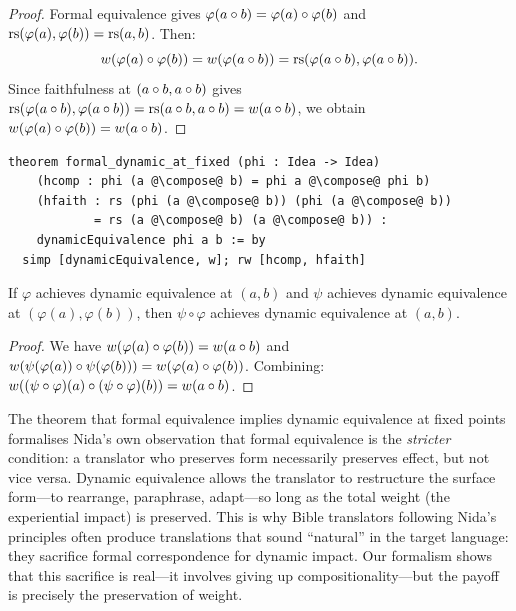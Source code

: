 \begin{proof}
Formal equivalence gives $\varphi(a \circ b) = \varphi(a) \circ
\varphi(b)$ and $\mathrm{rs}(\varphi(a), \varphi(b)) = \mathrm{rs}(a, b)$.  Then:
\[
  w(\varphi(a) \circ \varphi(b))
    = w(\varphi(a \circ b))
    = \mathrm{rs}(\varphi(a \circ b), \varphi(a \circ b)).
\]
Since faithfulness at $(a \circ b, a \circ b)$ gives
$\mathrm{rs}(\varphi(a \circ b), \varphi(a \circ b)) = \mathrm{rs}(a \circ b, a \circ b)
= w(a \circ b)$, we obtain $w(\varphi(a) \circ \varphi(b)) = w(a \circ b)$.
\end{proof}

\begin{lstlisting}
theorem formal_dynamic_at_fixed (phi : Idea -> Idea)
    (hcomp : phi (a @\compose@ b) = phi a @\compose@ phi b)
    (hfaith : rs (phi (a @\compose@ b)) (phi (a @\compose@ b))
            = rs (a @\compose@ b) (a @\compose@ b)) :
    dynamicEquivalence phi a b := by
  simp [dynamicEquivalence, w]; rw [hcomp, hfaith]
\end{lstlisting}

\begin{theorem}
\label{thm:dynamic-comp}
If $\varphi$ achieves dynamic equivalence at $(a, b)$ and $\psi$ achieves
dynamic equivalence at $(\varphi(a), \varphi(b))$, then $\psi \circ \varphi$
achieves dynamic equivalence at $(a, b)$.
\end{theorem}

\begin{proof}
We have $w(\varphi(a) \circ \varphi(b)) = w(a \circ b)$ and
$w(\psi(\varphi(a)) \circ \psi(\varphi(b))) =
 w(\varphi(a) \circ \varphi(b))$.
Combining: $w((\psi \circ \varphi)(a) \circ (\psi \circ \varphi)(b))
= w(a \circ b)$.
\end{proof}

\begin{interpretation}
\label{int:nida-hierarchy}
The theorem that formal equivalence implies dynamic equivalence at fixed
points formalises Nida's own observation that formal equivalence is the
\emph{stricter} condition: a translator who preserves form necessarily
preserves effect, but not vice versa.  Dynamic equivalence allows the
translator to restructure the surface form---to rearrange, paraphrase,
adapt---so long as the total weight (the experiential impact) is preserved.
This is why Bible translators following Nida's principles often produce
translations that sound ``natural'' in the target language: they sacrifice
formal correspondence for dynamic impact.  Our formalism shows that this
sacrifice is real---it involves giving up compositionality---but the
payoff is precisely the preservation of weight.
\end{interpretation}

